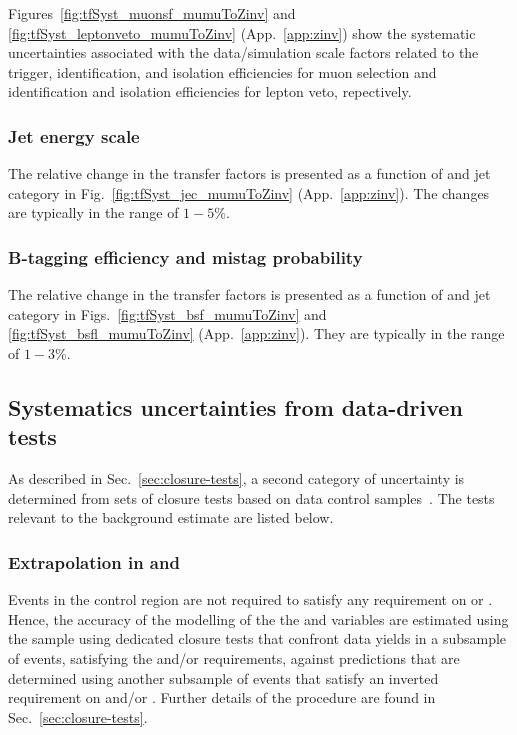 Figures~\ref{fig:tfSyst_muonsf_mumuToZinv} and
\ref{fig:tfSyst_leptonveto_mumuToZinv} (App.~\ref{app:zinv}) show the
systematic uncertainties associated with the data/simulation scale
factors related to the trigger, identification, and isolation
efficiencies for muon selection and identification and isolation
efficiencies for lepton veto, repectively.

\subsubsection{Jet energy scale}
\label{sec:tfSyst_jec-zinv}

The relative change in the transfer factors is presented as a function
of \scalht and jet category in Fig.~\ref{fig:tfSyst_jec_mumuToZinv}
(App.~\ref{app:zinv}). The changes are typically in the range of
$1-5\%$.

\subsubsection{B-tagging efficiency and mistag probability}
\label{sec:tfSyst_btag-zinv}

The relative change in the transfer factors is presented as a function
of \scalht and jet category in Figs.~\ref{fig:tfSyst_bsf_mumuToZinv} and
\ref{fig:tfSyst_bsfl_mumuToZinv} (App.~\ref{app:zinv}).  They are
typically in the range of $1-3\%$.

\subsection{Systematics uncertainties from data-driven tests}
\label{sec:closure-tests-zinv}

As described in Sec.~\ref{sec:closure-tests}, a second category of
uncertainty is determined from sets of closure tests based on data
control samples~\cite{RA1Paper2012}. The tests relevant to the \znunuj
background estimate are listed below. 

\subsubsection{Extrapolation in \texorpdfstring{\alphat}{AlphaT} and
  \texorpdfstring{\bdphi}{biased dPhi}}
\label{sec:tfSyst_alphaT-zinv}

Events in the \mmj control region are not required to satisfy any
requirement on \alphat or \bdphi. Hence, the accuracy of the modelling
of the the \alphat and \bdphi variables are estimated using the \mmj
sample using dedicated closure tests that confront data yields in a
subsample of \mmj events, satisfying the \alphat and/or \bdphi
requirements, against predictions that are determined using another
subsample of \mmj events that satisfy an inverted requirement on
\alphat and/or \bdphi. Further details of the procedure are found in
Sec.~\ref{sec:closure-tests}. 


